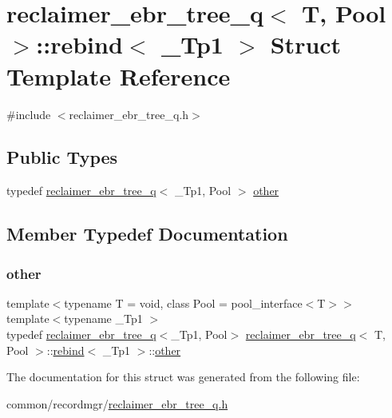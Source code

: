 \hypertarget{structreclaimer__ebr__tree__q_1_1rebind}{}\section{reclaimer\+\_\+ebr\+\_\+tree\+\_\+q$<$ T, Pool $>$\+:\+:rebind$<$ \+\_\+\+Tp1 $>$ Struct Template Reference}
\label{structreclaimer__ebr__tree__q_1_1rebind}


{\ttfamily \#include $<$reclaimer\+\_\+ebr\+\_\+tree\+\_\+q.\+h$>$}

\subsection*{Public Types}
\begin{DoxyCompactItemize}
\item 
typedef \hyperlink{classreclaimer__ebr__tree__q}{reclaimer\+\_\+ebr\+\_\+tree\+\_\+q}$<$ \+\_\+\+Tp1, Pool $>$ \hyperlink{structreclaimer__ebr__tree__q_1_1rebind_a7bfa82d51dc891c9438c2da257621a1e}{other}
\end{DoxyCompactItemize}


\subsection{Member Typedef Documentation}
\mbox{\label{structreclaimer__ebr__tree__q_1_1rebind_a7bfa82d51dc891c9438c2da257621a1e}} 
\subsubsection{\texorpdfstring{other}{other}}
{\footnotesize\ttfamily template$<$typename T  = void, class Pool  = pool\+\_\+interface$<$\+T$>$$>$ \\
template$<$typename \+\_\+\+Tp1 $>$ \\
typedef \hyperlink{classreclaimer__ebr__tree__q}{reclaimer\+\_\+ebr\+\_\+tree\+\_\+q}$<$\+\_\+\+Tp1, Pool$>$ \hyperlink{classreclaimer__ebr__tree__q}{reclaimer\+\_\+ebr\+\_\+tree\+\_\+q}$<$ T, Pool $>$\+::\hyperlink{structreclaimer__ebr__tree__q_1_1rebind}{rebind}$<$ \+\_\+\+Tp1 $>$\+::\hyperlink{structreclaimer__ebr__tree__q_1_1rebind_a7bfa82d51dc891c9438c2da257621a1e}{other}}



The documentation for this struct was generated from the following file\+:\begin{DoxyCompactItemize}
\item 
common/recordmgr/\hyperlink{reclaimer__ebr__tree__q_8h}{reclaimer\+\_\+ebr\+\_\+tree\+\_\+q.\+h}\end{DoxyCompactItemize}
